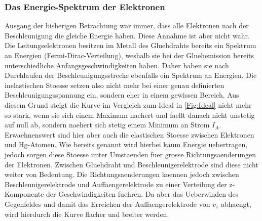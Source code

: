 \documentclass[titlepage=firstcover, captions=tableheading]{scrartcl}
\begin{document}
\subsubsection{Das Energie-Spektrum der Elektronen}
Ausgang der bisherigen Betrachtung war immer, dass alle Elektronen nach der Beschleunigung die gleiche Energie haben. Diese Annahme ist aber nicht wahr. Die Leitungselektronen besitzen im Metall des Gluehdrahts bereits ein Spektrum an Energien (Fermi-Dirac-Verteilung), weshalb sie bei der Gluehemission bereits unterschiedliche Anfangsgeschwindigkeiten haben. Daher haben sie nach Durchlaufen der Beschleunigungsstrecke ebenfalls ein Spektrum an Energien. Die inelastischen Stoesse setzen also nicht mehr bei einer genau definierten Beschleunigungsspannung ein, sondern eher in einem gewissen Bereich. Aus diesem Grund steigt die Kurve im Vergleich zum Ideal in \ref{Fig:Ideal} nicht mehr so stark, wenn sie sich einem Maximum naehert und faellt danach nicht unstetig auf null ab, sondern naehert sich stetig einem Minimum an Strom $I_A$.\\
Erwaehnenswert sind hier aber auch die elastischen Stoesse zwischen Elektronen und Hg-Atomen. Wie bereits genannt wird hierbei kaum Energie uebertragen, jedoch sorgen diese Stoesse unter Umstaenden fuer grosse Richtungsaenderungen der Elektronen. Zwischen Gluehdraht und Beschleunigerelektrode sind diese nicht weiter von Bedeutung. Die Richtungsaenderungen koennen jedoch zwischen Beschleunigerelektrode und Auffaengerelektrode zu einer Verteilung der z-Komponente der Geschwindigkeiten fuehren. Da aber das Ueberwinden des Gegenfeldes und damit das Erreichen der Auffaengerelektrode von $v_z$ abhaengt, wird hierdurch die Kurve flacher und breiter werden.\\
\end{document}
